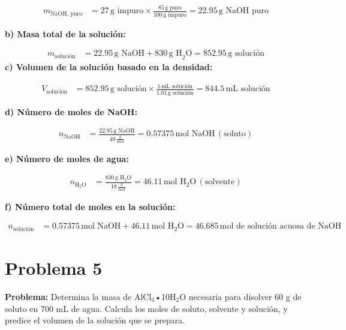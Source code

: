 \documentclass{article}
\begin{document}
\begin{align*}
    m_{\text{NaOH, puro}} &= 27 \, \text{g impuro} \times \frac{85 \, \text{g puro}}{100 \, \text{g impuro}} = 22.95 \, \text{g NaOH puro}
\end{align*}

\textbf{b) Masa total de la solución:}

\begin{align*}
    m_{\text{solución}} &= 22.95 \, \text{g NaOH} + 830 \, \text{g H}_2\text{O} = 852.95 \, \text{g solución}
\end{align*}
\newpage
\textbf{c) Volumen de la solución basado en la densidad:}

\begin{align*}
    V_{\text{solución}} &= 852.95 \, \text{g solución} \times \frac{1 \, \text{mL solución}}{1.01 \, \text{g solución}} = 844.5 \, \text{mL solución}
\end{align*}

\textbf{d) Número de moles de NaOH:}

\begin{align*}
    n_{\text{NaOH}} &= \frac{22.95 \, \text{g NaOH}}{40 \, \frac{\text{g}}{\text{mol}}} = 0.57375 \, \text{mol NaOH} \, (\text{soluto})
\end{align*}

\textbf{e) Número de moles de agua:}

\begin{align*}
    n_{\text{H}_2\text{O}} &= \frac{830 \, \text{g H}_2\text{O}}{18 \, \frac{\text{g}}{\text{mol}}} = 46.11 \, \text{mol H}_2\text{O} \, (\text{solvente})
\end{align*}

\textbf{f) Número total de moles en la solución:}

\begin{align*}
    n_{\text{solución}} &= 0.57375 \, \text{mol NaOH} + 46.11 \, \text{mol H}_2\text{O} = 46.685 \, \text{mol de solución acuosa de NaOH}
\end{align*}










\newpage
\section*{Problema 5}
\textbf{Problema:}
Determina la masa de AlCl$_3$•10H$_2$O necesaria para disolver 60 g de soluto en 700 mL de agua. Calcula los moles de soluto, solvente y solución, y predice el volumen de la solución que se prepara.
\end{document}
